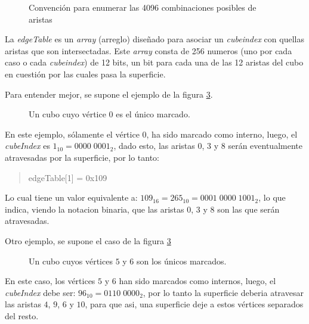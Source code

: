 \begin{figure}[hbt]
	\makebox[\textwidth]{\framebox[0.4\textwidth]{\rule{0pt}{0.3\textwidth}}}
	\caption{Convención para enumerar las 4096 combinaciones posibles de aristas}
	\label{f:ch:implementacion:sec:CubeIndex:edgeTable:edge_convention}
\end{figure}

La \emph{edgeTable} es un \emph{array} (arreglo) diseñado para asociar un \emph{cubeindex} con quellas aristas que son intersectadas. Este \emph{array} consta de 256 numeros (uno por cada caso o cada \emph{cubeindex}) de 12 bits, un bit para cada una de las 12 aristas del cubo en cuestión por las cuales pasa la superficie.

Para entender mejor, se supone el ejemplo de la figura \ref{f:ch:implementacion:sec:CubeIndex:edgeTable:example}.

\begin{figure}[hbt]
	\makebox[\textwidth]{\framebox[0.3\textwidth]{\rule{0pt}{0.2\textwidth}}}
	\caption{Un cubo cuyo vértice $0$ es el único marcado.}
	\label{f:ch:implementacion:sec:CubeIndex:edgeTable:example}
\end{figure}

En este ejemplo, sólamente el vértice $0$, ha sido marcado como interno, luego, el \emph{cubeIndex} es $1_{10} = 0000 \; 0001_{2}$, dado esto, las aristas $0$, $3$ y $8$ serán eventualmente atravesadas por la superficie, por lo tanto:

\begin{quote}
	edgeTable[1] = 0x109
\end{quote}

Lo cual tiene un valor equivalente a: $109_{16} = 265_{10} = 0001 \; 0000 \; 1001_{2}$, lo que indica, viendo la notacion binaria, que las aristas $0$, $3$ y $8$ son las que serán atravesadas.

Otro ejemplo, se supone el caso de la figura \ref{f:ch:implementacion:sec:CubeIndex:edgeTable:example}

\begin{figure}[hbt]
	\makebox[\textwidth]{\framebox[0.3\textwidth]{\rule{0pt}{0.2\textwidth}}}
	\caption{Un cubo cuyos vértices $5$ y $6$ son los únicos marcados.}
	\label{f:ch:implementacion:sec:CubeIndex:edgeTable:example}
\end{figure}

En este caso, los vértices $5$ y $6$ han sido marcados como internos, luego, el \emph{cubeIndex} debe ser: $96_{10} = 0110 \; 0000_{2}$, por lo tanto la superficie deberia atravesar las aristas $4$, $9$, $6$ y $10$, para que asi, una superficie deje a estos vértices separados del resto.

